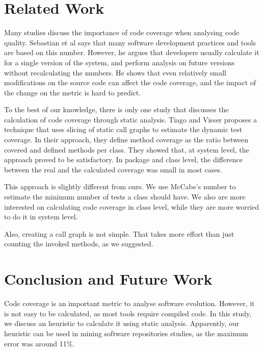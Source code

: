 \documentclass{sig-alternate}
\begin{document}
\section{Related Work}
\label{sec-related-work}

Many studies discuss the importance of code coverage when analysing code quality. 
Sebastian et al \cite{sebastian} says that many software development practices and tools
are based on this number. However, he argues that developers usually calculate it for a single
version of the system, and perform analysis on future versions without recalculating the numbers.
He shows that even relatively small modifications on
the source code can affect the code coverage, and the impact of the change on the
metric is hard to predict.

To the best of our knowledge, there is only one study that discusses the calculation of
code coverage through static analysis.
Tiago and Visser \cite{tiago} proposes a
technique that uses slicing of static call graphs to estimate the
dynamic test coverage. 
In their approach, they define method coverage as the ratio between covered 
and defined methods per class. They showed that, at system level, the approach
proved to be satisfactory. In package and class level, the difference between
the real and the calculated coverage was small in most cases.

This approach is slightly different from ours. We use McCabe's number to estimate the
minimum number of tests a class should have. We also are more interested on calculating
code coverage in class level, while they are more worried to do it in system level. 

Also, creating a call graph is not simple. That takes more effort than just counting
the invoked methods, as we suggested.

\section{Conclusion and Future Work}
\label{sec-conclusion}

Code coverage is an important metric to analyse software evolution. However, it is not easy
to be calculated, as most tools require compiled code. In this study, we discuss an heuristic
to calculate it using static analysis.
Apparently, our heuristic can be used in mining software repositories studies, as the maximum
error was around 11\%.
\end{document}
